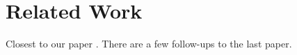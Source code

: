 \documentclass{article}
\newcommand{\evdp}[1]{\textcolor{blue}{[\textbf{EvdP:} #1]}}
\begin{document}


\section{Related Work}

Closest to our paper \cite{klamt18Supervised,rodriguez18Transferringa,rodriguez18Transferringb}. There are a few follow-ups to the last paper. \cite{simeonov20Long,you21OmniHang,menon22Viewpoint,lu22Online,wen22You,cong23Comprehensive}
\end{document}
